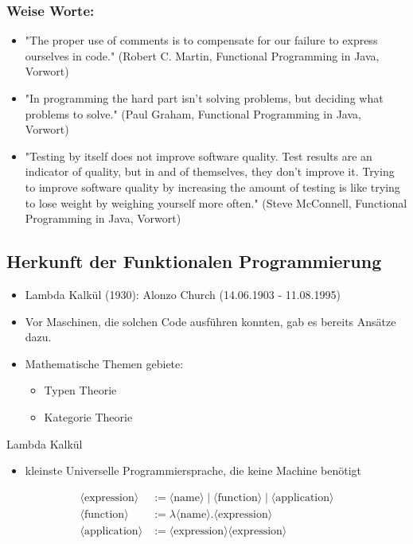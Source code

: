 \documentclass{beamer}
\begin{document}
\begin{frame}
\frametitle{Weise Worte:}
\begin{itemize}
\item \textmd{"The proper use of comments is to compensate for our failure to express ourselves in code." (Robert C. Martin, Functional Programming in Java, Vorwort)}
\item \textmd{"In programming the hard part isn’t solving problems, but deciding what problems to solve." (Paul Graham, Functional Programming in Java, Vorwort)}
\item \textmd{"Testing by itself does not improve software quality. Test results are an indicator of quality, but
in and of themselves, they don’t improve it. Trying to improve software quality by increasing
the amount of testing is like trying to lose weight by weighing yourself more often." (Steve McConnell, Functional Programming in Java, Vorwort)}
\end{itemize}
\end{frame}


\begin{frame}
	\section{Herkunft der Funktionalen Programmierung}
	\begin{itemize}
		\item Lambda Kalkül (1930):  Alonzo Church (14.06.1903 - 11.08.1995)
		\item Vor Maschinen, die solchen Code ausführen konnten, gab es bereits Ansätze dazu.
        \item Mathematische Themen gebiete: 
        \begin{itemize}
        	\item Typen Theorie
        	\item Kategorie Theorie
        \end{itemize} 
	\end{itemize}
\end{frame}

\begin{frame}{Lambda Kalkül }
		\begin{itemize}
				\item kleinste Universelle Programmiersprache, die keine Machine benötigt
		\end{itemize}
	\begin{align*}
		\langle \text{expression} \rangle & := \langle \text{name} \rangle \mid \langle \text{function} \rangle \mid \langle \text{application} \rangle \\
		\langle \text{function} \rangle & := \lambda \langle \text{name} \rangle . \langle \text{expression} \rangle \\
		\langle \text{application} \rangle & := \langle \text{expression} \rangle \langle \text{expression} \rangle
	\end{align*}
	\end{frame}
\end{document}
